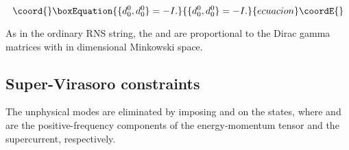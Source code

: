 \documentclass[a4paper,a4paper]{article}
\begin{document}
\begin{equation}\coord{}\boxEquation{
\{d_{0}^{0}, d_{0}^{0}\}=-I.
}{
\{d_{0}^{0}, d_{0}^{0}\}=-I.
}{ecuacion}\coordE{}\end{equation}

As in the ordinary RNS string, the \coordHE{} and \coordHE{} are
proportional to the Dirac gamma matrices with \coordHE{} in \coordHE{} dimensional Minkowski space.

\subsection{Super-Virasoro constraints}

The unphysical modes are eliminated by imposing
\coordHE{} and
\coordHE{} on the states, where
\coordHE{} and \coordHE{} are the
positive-frequency components of the energy-momentum tensor and
the supercurrent, respectively.
\end{document}
